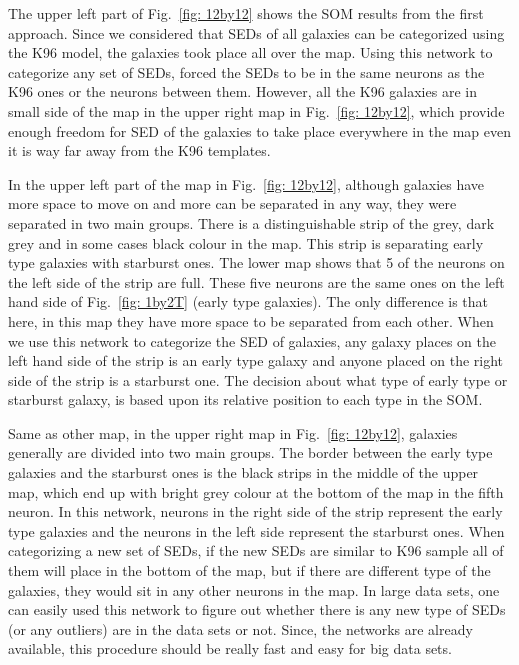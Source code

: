 \documentclass[useAMS,usenatbib]{mn2e}
\begin{document}
    The upper left part of Fig.~\ref{fig: 12by12} shows the SOM results from the first approach. 
    Since we considered that SEDs of all galaxies can be categorized using the K96 model, the galaxies took place all over the map.
    Using this network to categorize any set of SEDs, forced the SEDs to be in the same neurons as the K96 ones or the neurons between them.
    However, all the K96 galaxies are in small side of the map in the upper right map in Fig.~\ref{fig: 12by12}, which provide enough freedom for SED of the galaxies to take place everywhere in the map even it is way far away from the K96 templates.
    
    
    In the upper left part of the map in Fig.~\ref{fig: 12by12}, although galaxies have more space to move on and more can be separated in any way, they were separated in two main groups.
    There is a distinguishable strip of the grey, dark grey and in some cases black colour in the map.
    This strip is separating early type galaxies with starburst ones.
    The lower map shows that 5 of the neurons on the left side of the strip are full. 
    These five neurons are the same ones on the left hand side of Fig.~\ref{fig: 1by2T} (early type galaxies).
    The only difference is that here, in this map they have more space to be separated from each other.
    When we use this network to categorize the SED of galaxies, any galaxy places on the left hand side of the strip is an early type galaxy and anyone placed on the right side of the strip is a starburst one.
    The decision about what type of early type or starburst galaxy, is based upon its relative position to each type in the SOM.
    
    Same as other map, in the upper right map in Fig.~\ref{fig: 12by12}, galaxies generally are divided into two main groups.
    The border between the early type galaxies and the starburst ones is the black strips in the middle of the upper map, which end up with bright grey colour at the bottom of the map in the fifth neuron.
    In this network, neurons in the right side of the strip represent the early type galaxies and the neurons in the left side represent the starburst ones. 
    When categorizing a new set of SEDs, if the new SEDs are similar to K96 sample all of them will place in the bottom of the map, but if there are different type of the galaxies, they would sit in any other neurons in the map.
    In large data sets, one can easily used this network to figure out whether there is any new type of SEDs (or any outliers) are in the data sets or not. 
    Since, the networks are already available, this procedure should be really fast and easy for big data sets.
    
\end{document}
